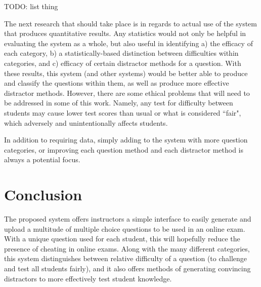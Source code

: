 \documentclass{article}
\begin{document}
TODO: list thing

The next research that should take place is in regards to actual use of the system that produces quantitative results. Any statistics would not only be helpful in evaluating the system as a whole, but also useful in identifying a) the efficacy of each category, b) a statistically-based distinction between difficulties within categories, and c) efficacy of certain distractor methods for a question. With these results, this system (and other systems) would be better able to produce and classify the questions within them, as well as produce more effective distractor methods. However, there are some ethical problems that will need to be addressed in some of this work. Namely, any test for difficulty between students may cause lower test scores than usual or what is considered ``fair", which adversely and unintentionally affects students. 

In addition to requiring data, simply adding to the system with more question categories, or improving each question method and each distractor method is always a potential focus.

\section{Conclusion} \label{sec-conclusion}

The proposed system offers instructors a simple interface to easily generate and upload a multitude of multiple choice questions to be used in an online exam. With a unique question used for each student, this will hopefully reduce the presence of cheating in online exams. Along with the many different categories, this system distinguishes between relative difficulty of a question (to challenge and test all students fairly), and it also offers methods of generating convincing distractors to more effectively test student knowledge. 
\end{document}
